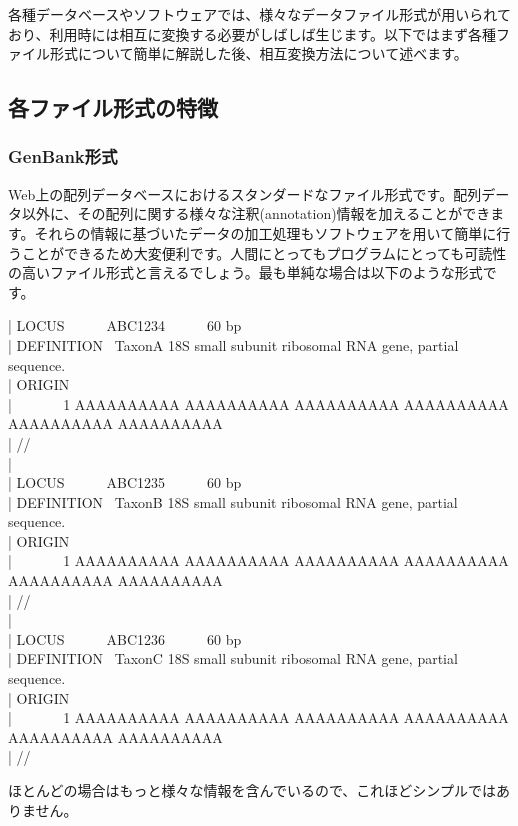 \documentclass[titlepage,10pt,a4paper]{jsbook}
\newenvironment{content}{\begin{shaded}\vspace{-1em}\raggedright\ttfamily\footnotesize\setlength{\baselineskip}{1.4em}}{\end{shaded}\vspace{-1em}}
\begin{document}
各種データベースやソフトウェアでは、様々なデータファイル形式が用いられており、利用時には相互に変換する必要がしばしば生じます。以下ではまず各種ファイル形式について簡単に解説した後、相互変換方法について述べます。

\subsection{各ファイル形式の特徴}

\subsubsection{GenBank形式}

Web上の配列データベースにおけるスタンダードなファイル形式です。配列データ以外に、その配列に関する様々な注釈(annotation)情報を加えることができます。それらの情報に基づいたデータの加工処理もソフトウェアを用いて簡単に行うことができるため大変便利です。人間にとってもプログラムにとっても可読性の高いファイル形式と言えるでしょう。最も単純な場合は以下のような形式です。
\begin{content}
| LOCUS~ ~ ~ ~ABC1234~ ~ ~ ~60 bp\\
| DEFINITION~ TaxonA 18S small subunit ribosomal RNA gene, partial sequence.\\
| ORIGIN\\
| ~ ~ ~ ~ 1 AAAAAAAAAA AAAAAAAAAA AAAAAAAAAA AAAAAAAAAA AAAAAAAAAA AAAAAAAAAA\\
| //\\
| ~\\
| LOCUS~ ~ ~ ~ABC1235~ ~ ~ ~60 bp\\
| DEFINITION~ TaxonB 18S small subunit ribosomal RNA gene, partial sequence.\\
| ORIGIN\\
| ~ ~ ~ ~ 1 AAAAAAAAAA AAAAAAAAAA AAAAAAAAAA AAAAAAAAAA AAAAAAAAAA AAAAAAAAAA\\
| //\\
| ~\\
| LOCUS~ ~ ~ ~ABC1236~ ~ ~ ~60 bp\\
| DEFINITION~ TaxonC 18S small subunit ribosomal RNA gene, partial sequence.\\
| ORIGIN\\
| ~ ~ ~ ~ 1 AAAAAAAAAA AAAAAAAAAA AAAAAAAAAA AAAAAAAAAA AAAAAAAAAA AAAAAAAAAA\\
| //
\end{content}
ほとんどの場合はもっと様々な情報を含んでいるので、これほどシンプルではありません。
\end{document}
